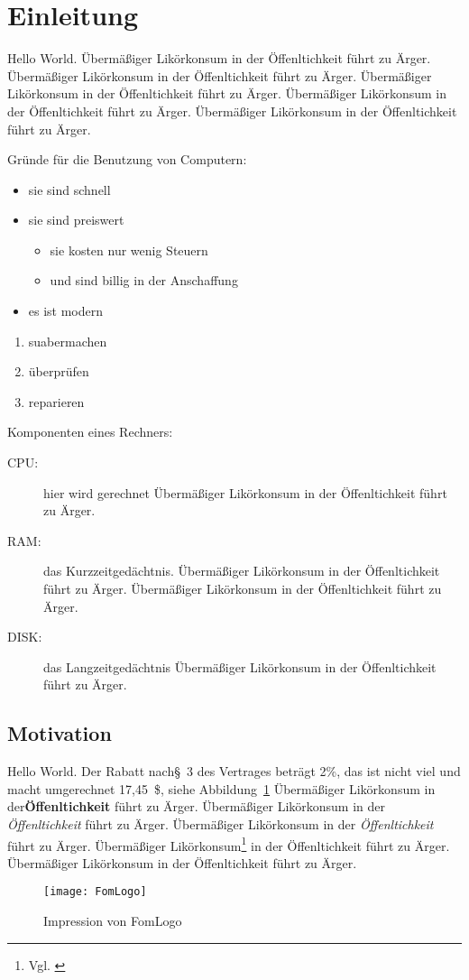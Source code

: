 

\section{Einleitung} 

Hello World.
Übermäßiger Likörkonsum in der Öffenltichkeit führt zu Ärger.
Übermäßiger Likörkonsum in der Öffenltichkeit führt zu Ärger.
Übermäßiger Likörkonsum in der Öffenltichkeit führt zu Ärger.
Übermäßiger Likörkonsum in der Öffenltichkeit führt zu Ärger.
Übermäßiger Likörkonsum in der Öffenltichkeit führt zu Ärger.

Gründe für die Benutzung von Computern:
\begin{itemize}
\item sie sind schnell
\item sie sind preiswert
\begin{itemize}
\item sie kosten nur wenig Steuern
\item und sind billig in der Anschaffung
\end{itemize}
\item es ist modern
\end{itemize}

\begin{enumerate}
\item suabermachen
\item überprüfen
\item reparieren
\end{enumerate}

Komponenten eines Rechners:
 \begin{description}
\item[CPU:] hier wird gerechnet
Übermäßiger Likörkonsum in der Öffenltichkeit führt zu Ärger.

\item[RAM:] das Kurzzeitgedächtnis. Übermäßiger Likörkonsum in der Öffenltichkeit führt zu Ärger.
Übermäßiger Likörkonsum in der Öffenltichkeit führt zu Ärger.

\item[DISK:] das Langzeitgedächtnis
Übermäßiger Likörkonsum in der Öffenltichkeit führt zu Ärger.
\end{description}
\subsection{Motivation}
Hello World. Der Rabatt nach\S~3 des Vertrages beträgt 2\%, das ist nicht viel und macht umgerechnet 17,45~\$, siehe Abbildung~\ref{fig:bald}
Übermäßiger Likörkonsum in der\textbf{Öffenltichkeit} führt zu Ärger. %
Übermäßiger Likörkonsum in der \textsl{Öffenltichkeit} führt zu Ärger.
Übermäßiger Likörkonsum in der \textit{Öffenltichkeit} führt zu Ärger.
Übermäßiger Likörkonsum\footnote{Vgl. \cite{Mitt95:Latex}} in der Öffenltichkeit führt zu Ärger.
Übermäßiger Likörkonsum in der Öffenltichkeit führt zu Ärger.

\begin{figure}[htb] %
\begin{center}
\texttt{[image: FomLogo]} %
\end{center}

\caption{Impression von FomLogo}
\label{fig:bald}
\end{figure}


